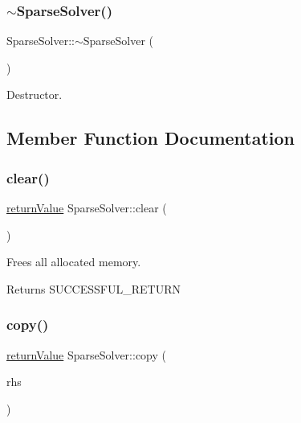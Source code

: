 \subsubsection{\texorpdfstring{$\sim$\+Sparse\+Solver()}{~SparseSolver()}}
{\footnotesize\ttfamily Sparse\+Solver\+::$\sim$\+Sparse\+Solver (\begin{DoxyParamCaption}{ }\end{DoxyParamCaption})\hspace{0.3cm}{\ttfamily [virtual]}}

Destructor. 

\subsection{Member Function Documentation}
\mbox{\label{class_sparse_solver_a3471628e99d49f5c2ec94573f00d7f9c}} 
\subsubsection{\texorpdfstring{clear()}{clear()}}
{\footnotesize\ttfamily \hyperlink{_message_handling_8hpp_a81d556f613bfbabd0b1f9488c0fa865e}{return\+Value} Sparse\+Solver\+::clear (\begin{DoxyParamCaption}{ }\end{DoxyParamCaption})\hspace{0.3cm}{\ttfamily [protected]}}

Frees all allocated memory. \begin{DoxyReturn}{Returns}
S\+U\+C\+C\+E\+S\+S\+F\+U\+L\+\_\+\+R\+E\+T\+U\+RN 
\end{DoxyReturn}
\mbox{\label{class_sparse_solver_a0d39524a52ac941663c6789d00282494}} 
\subsubsection{\texorpdfstring{copy()}{copy()}}
{\footnotesize\ttfamily \hyperlink{_message_handling_8hpp_a81d556f613bfbabd0b1f9488c0fa865e}{return\+Value} Sparse\+Solver\+::copy (\begin{DoxyParamCaption}\item[{const \hyperlink{class_sparse_solver}{Sparse\+Solver} \&}]{rhs }\end{DoxyParamCaption})\hspace{0.3cm}{\ttfamily [protected]}}

